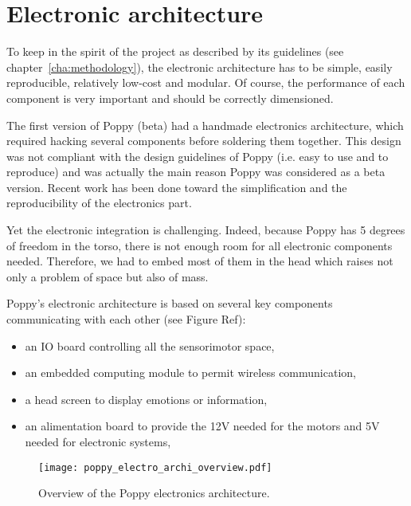 
\section{Electronic architecture} %
\label{sec:poppy-electronic}

To keep in the spirit of the project as described by its guidelines (see chapter~\ref{cha:methodology}), the electronic architecture has to be simple, easily reproducible, relatively low-cost and modular. Of course, the performance of each component is very important and should be correctly dimensioned.

The first version of Poppy (beta) had a handmade electronics architecture, which required hacking several components before soldering them together. This design was not compliant with the design guidelines of Poppy (i.e. easy to use and to reproduce) and was actually the main reason Poppy was considered as a beta version. Recent work has been done toward the simplification and the reproducibility of the electronics part.

Yet the electronic integration is challenging. Indeed, because Poppy has 5 degrees of freedom in the torso, there is not enough room for all electronic components needed. Therefore, we had to embed most of them in the head which raises not only a problem of space but also of mass.

Poppy's electronic architecture is based on several key components communicating with each other (see Figure Ref):
\begin{itemize}
    \item an IO board controlling all the sensorimotor space,
    \item an embedded computing module to permit wireless communication,
    \item a head screen to display emotions or information,
    \item an alimentation board to provide the 12V needed for the motors and 5V needed for electronic systems,
\end{itemize}

\begin{figure}[tb]
    \begin{center}
        \texttt{[image: poppy\_electro\_archi\_overview.pdf]}
    \end{center}
    \caption{Overview of the Poppy electronics architecture.}

\end{figure}

